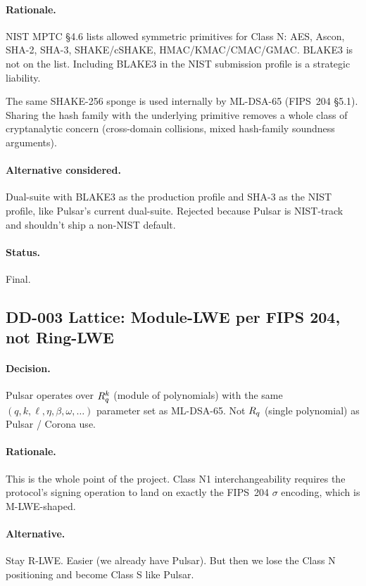 \paragraph{Rationale.}
NIST MPTC \S4.6 lists allowed symmetric primitives for Class N: AES,
Ascon, SHA-2, SHA-3, SHAKE/cSHAKE, HMAC/KMAC/CMAC/GMAC. BLAKE3 is
not on the list. Including BLAKE3 in the NIST submission profile is
a strategic liability.

The same SHAKE-256 sponge is used internally by ML-DSA-65 (FIPS~204
\S5.1). Sharing the hash family with the underlying primitive
removes a whole class of cryptanalytic concern (cross-domain
collisions, mixed hash-family soundness arguments).

\paragraph{Alternative considered.}
Dual-suite with BLAKE3 as the production profile and SHA-3 as the
NIST profile, like Pulsar's current dual-suite. Rejected because
Pulsar is NIST-track and shouldn't ship a non-NIST default.

\paragraph{Status.}
Final.

\subsection{DD-003 Lattice: Module-LWE per FIPS 204, not Ring-LWE}

\paragraph{Decision.}
Pulsar operates over $R_q^k$ (module of polynomials) with the same
$(q, k, \ell, \eta, \beta, \omega, \ldots)$ parameter set as
ML-DSA-65. Not $R_q$ (single polynomial) as Pulsar / Corona use.

\paragraph{Rationale.}
This is the whole point of the project. Class N1 interchangeability
requires the protocol's signing operation to land on exactly the
FIPS~204 $\sigma$ encoding, which is M-LWE-shaped.

\paragraph{Alternative.}
Stay R-LWE. Easier (we already have Pulsar). But then we lose the
Class N positioning and become Class S like Pulsar.

